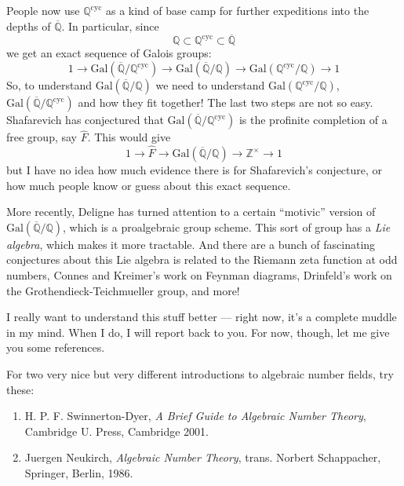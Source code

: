 \documentclass{article}
\begin{document}
People now use \(\mathbb{Q}^{\mathrm{cyc}}\) as a kind of base camp for
further expeditions into the depths of \(\overline{\mathbb{Q}}\). In
particular, since
\[\mathbb{Q} \subset \mathbb{Q}^{\mathrm{cyc}} \subset \overline{\mathbb{Q}}\]
we get an exact sequence of Galois groups:
\[1 \to \mathrm{Gal}(\overline{\mathbb{Q}}/\mathbb{Q}^{\mathrm{cyc}}) \to \mathrm{Gal}(\overline{\mathbb{Q}}/\mathbb{Q}) \to \mathrm{Gal}(\mathbb{Q}^{\mathrm{cyc}}/\mathbb{Q}) \to 1\]
So, to understand \(\mathrm{Gal}(\overline{\mathbb{Q}}/\mathbb{Q})\) we
need to understand
\(\mathrm{Gal}(\mathbb{Q}^{\mathrm{cyc}}/\mathbb{Q})\),
\(\mathrm{Gal}(\overline{\mathbb{Q}}/\mathbb{Q}^{\mathrm{cyc}})\) and
how they fit together! The last two steps are not so easy. Shafarevich
has conjectured that
\(\mathrm{Gal}(\overline{\mathbb{Q}}/\mathbb{Q}^{\mathrm{cyc}})\) is the
profinite completion of a free group, say \(\widehat{F}\). This would
give
\[1 \to \widehat{F} \to \mathrm{Gal}(\overline{\mathbb{Q}}/\mathbb{Q}) \to \mathbb{Z}^\times \to 1\]
but I have no idea how much evidence there is for Shafarevich's
conjecture, or how much people know or guess about this exact sequence.

More recently, Deligne has turned attention to a certain ``motivic''
version of \(\mathrm{Gal}(\overline{\mathbb{Q}}/\mathbb{Q})\), which is
a proalgebraic group scheme. This sort of group has a \emph{Lie
algebra}, which makes it more tractable. And there are a bunch of
fascinating conjectures about this Lie algebra is related to the Riemann
zeta function at odd numbers, Connes and Kreimer's work on Feynman
diagrams, Drinfeld's work on the Grothendieck-Teichmueller group, and
more!

I really want to understand this stuff better --- right now, it's a
complete muddle in my mind. When I do, I will report back to you. For
now, though, let me give you some references.

For two very nice but very different introductions to algebraic number
fields, try these:

\begin{enumerate}
\def\labelenumi{\arabic{enumi})}
\setcounter{enumi}{1}
\item
  H. P. F. Swinnerton-Dyer, \emph{A Brief Guide to Algebraic Number
  Theory}, Cambridge U. Press, Cambridge 2001.
\item
  Juergen Neukirch, \emph{Algebraic Number Theory}, trans. Norbert
  Schappacher, Springer, Berlin, 1986.
\end{enumerate}
\end{document}
